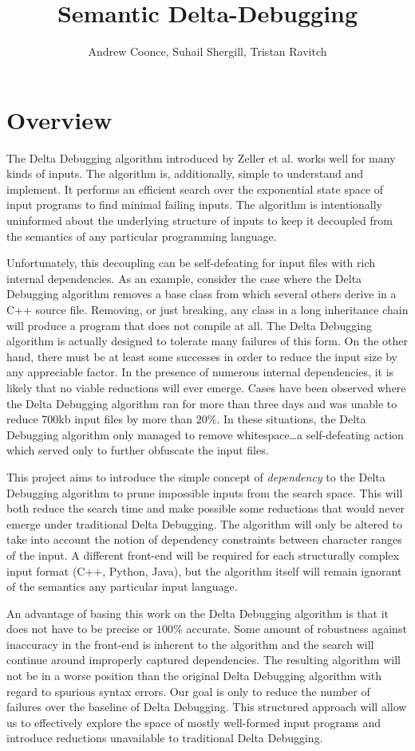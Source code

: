 \documentclass[11pt]{article}
\title{Semantic Delta-Debugging}
\author{
Andrew Coonce, Suhail Shergill, Tristan Ravitch\\
\email{\{coonce, shergill, travitch\}@cs.wisc.edu}
}
\begin{document}
\maketitle

\section{Overview}
The Delta Debugging algorithm introduced by Zeller et al. \cite{dd} works well
for many kinds of inputs. The algorithm is, additionally, simple to understand
and implement. It performs an efficient search over the exponential state space
of input programs to find minimal failing inputs. The algorithm is intentionally
uninformed about the underlying structure of inputs to keep it decoupled from
the semantics of any particular programming language.

Unfortunately, this decoupling can be self-defeating for input files with
rich internal dependencies. As an example, consider the case where the Delta
Debugging algorithm removes a base class from which several others derive in a
C++ source file. Removing, or just breaking, any class in a long inheritance
chain will produce a program that does not compile at all. The Delta Debugging
algorithm is actually designed to tolerate many failures of this form. On the
other hand, there must be at least some successes in order to reduce the input
size by any appreciable factor. In the presence of numerous internal
dependencies, it is likely that no viable reductions will ever emerge. Cases
have been observed where the Delta Debugging algorithm ran for more than three
days and was unable to reduce 700kb input files by more than $20 \%$. In these
situations, the Delta Debugging algorithm only managed to remove 
whitespace\ldots a self-defeating action which served only to further obfuscate
the input files.

This project aims to introduce the simple concept of \emph{dependency} to the
Delta Debugging algorithm to prune impossible inputs from the search space.
This will both reduce the search time and make possible some reductions
that would never emerge under traditional Delta Debugging. The algorithm will
only be altered to take into account the notion of dependency constraints
between character ranges of the input. A different front-end will be required for each
structurally complex input format (C++, Python, Java), but the algorithm itself
will remain ignorant of the semantics any particular input language.

An advantage of basing this work on the Delta Debugging algorithm is that it
does not have to be precise or $100 \%$ accurate. Some amount of robustness
against inaccuracy in the front-end is inherent to the algorithm and the search
will continue around improperly captured dependencies.  The resulting algorithm
will not be in a worse position than the original Delta Debugging algorithm with
regard to spurious syntax errors.  Our goal is only to reduce the number of 
failures over the baseline of Delta Debugging. This structured approach will 
allow us to effectively explore the space of mostly well-formed input programs 
and introduce reductions unavailable to traditional Delta Debugging.
\end{document}
